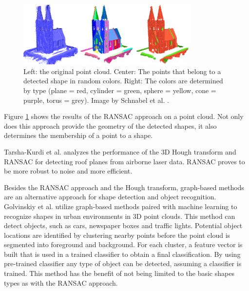 \begin{figure}
    \centering
    \includegraphics[width=0.8\textwidth]{Related_Work/schnabel_example.png}%
    \caption[Church with points colored by detected shape]
		{Left: the original point cloud. Center: The points that belong to a detected shape in random colors. Right: The colors are determined by type (plane = red, cylinder = green, sphere = yellow, cone = purple, torus = grey). Image by Schnabel et al. \cite{schnabel-2007-efficient}. }
    \label{fig:schnabel_church}
\end{figure}

Figure \ref{fig:schnabel_church} shows the results of the RANSAC approach on a point cloud. Not only does this approach provide the geometry of the detected shapes, it also determines the membership of a point to a shape. 

\par

Tarsha-Kurdi et al. \cite{tarsha2007hough} analyzes the performance of the 3D Hough transform and RANSAC for detecting roof planes from airborne laser data. RANSAC proves to be more robust to noise and more efficient.

\par

Besides the RANSAC approach and the Hough transform, graph-based methods are an alternative approach for shape detection and object recognition. Golvinskiy et al. \cite{golovinskiy2009shape} utilize graph-based methods paired with machine learning to recognize shapes in urban environments in 3D point clouds. This method can detect objects, such as cars, newspaper boxes and traffic lights. Potential object locations are identified by clustering nearby points before the point cloud is segmented into foreground and background. For each cluster, a feature vector is built that is used in a trained classifier to obtain a final classification. By using pre-trained classifier any type of object can be detected, assuming a classifier is trained. This method has the benefit of not being limited to the basic shapes types as with the RANSAC approach. 

